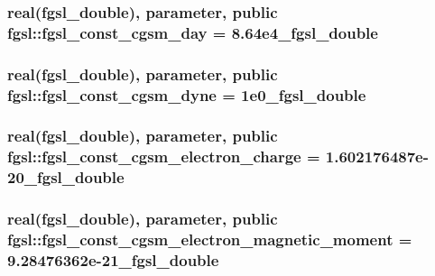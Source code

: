 \subsubsection[{fgsl\+\_\+const\+\_\+cgsm\+\_\+day}]{\setlength{\rightskip}{0pt plus 5cm}real({\bf fgsl\+\_\+double}), parameter, public fgsl\+::fgsl\+\_\+const\+\_\+cgsm\+\_\+day = 8.\+64e4\+\_\+fgsl\+\_\+double}\label{namespacefgsl_af34712504add6a207ec8e068ff61d8cd}
\hypertarget{namespacefgsl_a9d4d18eee80940b4fda61ccf8eb7a0a1}{}
\subsubsection[{fgsl\+\_\+const\+\_\+cgsm\+\_\+dyne}]{\setlength{\rightskip}{0pt plus 5cm}real({\bf fgsl\+\_\+double}), parameter, public fgsl\+::fgsl\+\_\+const\+\_\+cgsm\+\_\+dyne = 1e0\+\_\+fgsl\+\_\+double}\label{namespacefgsl_a9d4d18eee80940b4fda61ccf8eb7a0a1}
\hypertarget{namespacefgsl_a5dafed1eec73194b34fc66d1e9337dc3}{}
\subsubsection[{fgsl\+\_\+const\+\_\+cgsm\+\_\+electron\+\_\+charge}]{\setlength{\rightskip}{0pt plus 5cm}real({\bf fgsl\+\_\+double}), parameter, public fgsl\+::fgsl\+\_\+const\+\_\+cgsm\+\_\+electron\+\_\+charge = 1.\+602176487e-\/20\+\_\+fgsl\+\_\+double}\label{namespacefgsl_a5dafed1eec73194b34fc66d1e9337dc3}
\hypertarget{namespacefgsl_aeef2a928302f3601b87ba01c486de9bd}{}
\subsubsection[{fgsl\+\_\+const\+\_\+cgsm\+\_\+electron\+\_\+magnetic\+\_\+moment}]{\setlength{\rightskip}{0pt plus 5cm}real({\bf fgsl\+\_\+double}), parameter, public fgsl\+::fgsl\+\_\+const\+\_\+cgsm\+\_\+electron\+\_\+magnetic\+\_\+moment = 9.\+28476362e-\/21\+\_\+fgsl\+\_\+double}\label{namespacefgsl_aeef2a928302f3601b87ba01c486de9bd}
\hypertarget{namespacefgsl_aeec1dd933fc3bc5a582363056455d46c}{}
